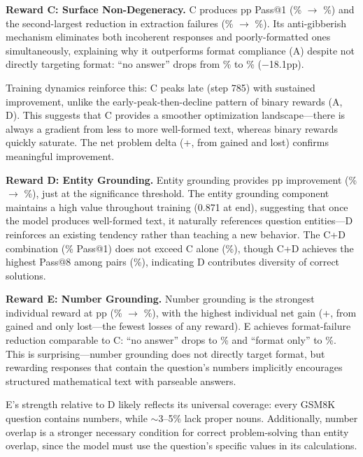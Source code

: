 \textbf{Reward C: Surface Non-Degeneracy.}
C produces \pFourSeparateCDeltaPassOne{}pp Pass@1 (\pFourBaselinePassOne\% $\to$ \pFourSeparateCPassOne\%) and the second-largest reduction in extraction failures (\pFourBaselineExtrFail\% $\to$ \pFourSeparateCExtrFail\%).
Its anti-gibberish mechanism eliminates both incoherent responses and poorly-formatted ones simultaneously, explaining why it outperforms format compliance (A) despite not directly targeting format: ``no answer'' drops from \pFourBaselineNoAnswer\% to \pFourSeparateCNoAnswer\% ($-$18.1pp).

Training dynamics reinforce this: C peaks late (step 785) with sustained improvement, unlike the early-peak-then-decline pattern of binary rewards (A, D).
This suggests that C provides a smoother optimization landscape---there is always a gradient from less to more well-formed text, whereas binary rewards quickly saturate.
The net problem delta (+\pFourSeparateCNet, from \pFourSeparateCGained{} gained and \pFourSeparateCLost{} lost) confirms meaningful improvement.

\textbf{Reward D: Entity Grounding.}
Entity grounding provides \pFourSeparateDDeltaPassOne{}pp improvement (\pFourBaselinePassOne\% $\to$ \pFourSeparateDPassOne\%), just at the significance threshold.
The entity grounding component maintains a high value throughout training (0.871 at end), suggesting that once the model produces well-formed text, it naturally references question entities---D reinforces an existing tendency rather than teaching a new behavior.
The C+D combination (\pFourCombinedCdPassOne\% Pass@1) does not exceed C alone (\pFourSeparateCPassOne\%), though C+D achieves the highest Pass@8 among pairs (\pFourCombinedCdPassEight\%), indicating D contributes diversity of correct solutions.

\textbf{Reward E: Number Grounding.}
Number grounding is the strongest individual reward at \pFourSeparateEDeltaPassOne{}pp (\pFourBaselinePassOne\% $\to$ \pFourSeparateEPassOne\%), with the highest individual net gain (+\pFourSeparateENet, from \pFourSeparateEGained{} gained and only \pFourSeparateELost{} lost---the fewest losses of any reward).
E achieves format-failure reduction comparable to C: ``no answer'' drops to \pFourSeparateENoAnswer\% and ``format only'' to \pFourSeparateEFormatOnly\%.
This is surprising---number grounding does not directly target format, but rewarding responses that contain the question's numbers implicitly encourages structured mathematical text with parseable answers.

E's strength relative to D likely reflects its universal coverage: every GSM8K question contains numbers, while $\sim$3--5\% lack proper nouns.
Additionally, number overlap is a stronger necessary condition for correct problem-solving than entity overlap, since the model must use the question's specific values in its calculations.
